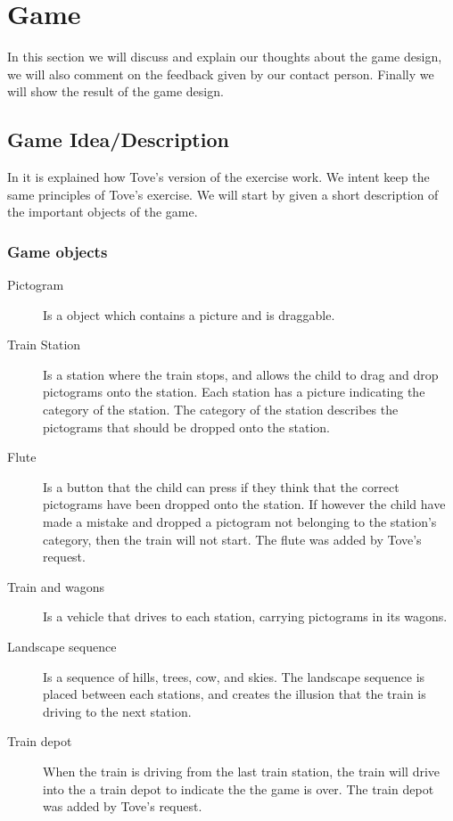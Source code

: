 \section{Game}
In this section we will discuss and explain our thoughts about the game design, we will also comment on the feedback given by our contact person. Finally we will show the result of the game design.
\subsection{Game Idea/Description}
In  it is explained how Tove's version of the exercise work. We intent keep the same principles of Tove's exercise. We will start by given a short description of the important objects of the game.
\subsubsection*{Game objects}
\begin{description}
\item[Pictogram] Is a object which contains a picture and is draggable.
\item[Train Station] Is a station where the train stops, and allows the child to drag and drop pictograms onto the station. Each station has a picture indicating the category of the station. The category of the station describes the pictograms that should be dropped onto the station.  

\item[Flute] Is a button that the child can press if they think that the correct pictograms have been dropped onto the station. If however the child have made a mistake and dropped a pictogram not belonging to the station's category, then the train will not start. The flute was added by Tove's request.

\item[Train and wagons] Is a vehicle that drives to each station, carrying pictograms in its wagons.

\item[Landscape sequence] Is a sequence of hills, trees, cow, and skies. The landscape sequence is placed between each stations, and creates the illusion that the train is driving to the next station.

\item[Train depot] When the train is driving from the last train station, the train will drive into the a train depot to indicate the the game is over. The train depot was added by Tove's request.
\end{description}

